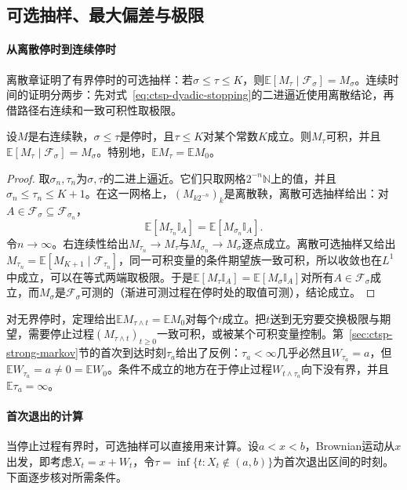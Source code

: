 \subsection{可选抽样、最大偏差与极限}
\label{sec:ctsp-optional-sampling}

\paragraph{从离散停时到连续停时}
离散章证明了有界停时的可选抽样：若$\sigma\leq\tau\leq K$，则$\mathbb E[M_\tau\mid\mathcal F_\sigma]=M_\sigma$。连续时间的证明分两步：先对式~\eqref{eq:ctsp-dyadic-stopping}的二进逼近使用离散结论，再借路径右连续和一致可积性取极限。

\begin{theorem}[连续时间的可选抽样]
  \label{thm:ctsp-optional-sampling}
  设$M$是右连续鞅，$\sigma\leq\tau$是停时，且$\tau\leq K$对某个常数$K$成立。则$M_\tau$可积，并且$\mathbb E[M_\tau\mid\mathcal F_\sigma]=M_\sigma$。特别地，$\mathbb EM_\tau=\mathbb EM_0$。
\end{theorem}

\begin{proof}
取$\sigma_n,\tau_n$为$\sigma,\tau$的二进上逼近。它们只取网格$2^{-n}\mathbb N$上的值，并且$\sigma_n\leq\tau_n\leq K+1$。在这一网格上，$(M_{k2^{-n}})_k$是离散鞅，离散可选抽样给出：对$A\in\mathcal F_\sigma\subseteq\mathcal F_{\sigma_n}$，
\[
  \mathbb E[M_{\tau_n}\mathbb I_A]=\mathbb E[M_{\sigma_n}\mathbb I_A].
\]
令$n\to\infty$。右连续性给出$M_{\tau_n}\to M_\tau$与$M_{\sigma_n}\to M_\sigma$逐点成立。离散可选抽样又给出$M_{\tau_n}=\mathbb E[M_{K+1}\mid\mathcal F_{\tau_n}]$，同一可积变量的条件期望族一致可积，所以收敛也在$L^1$中成立，可以在等式两端取极限。于是$\mathbb E[M_\tau\mathbb I_A]=\mathbb E[M_\sigma\mathbb I_A]$对所有$A\in\mathcal F_\sigma$成立，而$M_\sigma$是$\mathcal F_\sigma$可测的（渐进可测过程在停时处的取值可测），结论成立。
\end{proof}

对无界停时，定理给出$\mathbb EM_{\tau\wedge t}=\mathbb EM_0$对每个$t$成立。把$t$送到无穷要交换极限与期望，需要停止过程$(M_{\tau\wedge t})_{t\geq0}$一致可积，或被某个可积变量控制。第~\ref{sec:ctsp-strong-markov}节的首次到达时刻$\tau_a$给出了反例：$\tau_a<\infty$几乎必然且$W_{\tau_a}=a$，但$\mathbb EW_{\tau_a}=a\neq0=\mathbb EW_0$。条件不成立的地方在于停止过程$W_{t\wedge\tau_a}$向下没有界，并且$\mathbb E\tau_a=\infty$。

\paragraph{首次退出的计算}
当停止过程有界时，可选抽样可以直接用来计算。设$a<x<b$，Brownian运动从$x$出发，即考虑$X_t=x+W_t$，令$\tau=\inf\{t:X_t\notin(a,b)\}$为首次退出区间的时刻。下面逐步核对所需条件。

